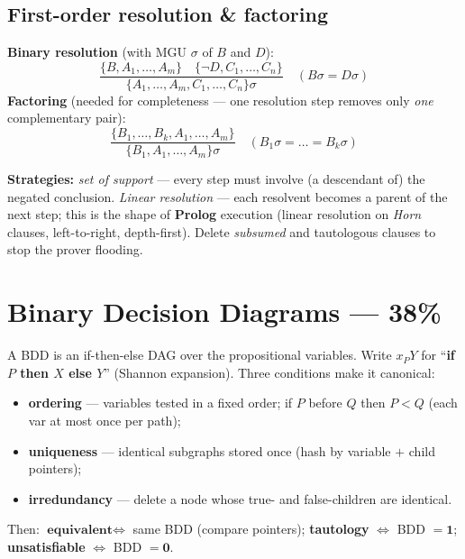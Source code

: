 \documentclass[11pt,a4paper]{article}
\begin{document}
\subsection{First-order resolution \& factoring}

\begin{must}
\textbf{Binary resolution} (with MGU $\sigma$ of $B$ and $D$):
\[
\frac{\{B,A_1,\dots,A_m\}\quad\{\neg D,C_1,\dots,C_n\}}{\{A_1,\dots,A_m,C_1,\dots,C_n\}\sigma}\quad(B\sigma=D\sigma)
\]
\textbf{Factoring} (needed for completeness --- one resolution step removes only \emph{one} complementary pair):
\[
\frac{\{B_1,\dots,B_k,A_1,\dots,A_m\}}{\{B_1,A_1,\dots,A_m\}\sigma}\quad(B_1\sigma=\dots=B_k\sigma)
\]
\end{must}

\begin{useful}
\textbf{Strategies:} \emph{set of support} --- every step must involve (a descendant of) the negated conclusion. \emph{Linear resolution} --- each resolvent becomes a parent of the next step; this is the shape of \textbf{Prolog} execution (linear resolution on \emph{Horn} clauses, left-to-right, depth-first). Delete \emph{subsumed} and tautologous clauses to stop the prover flooding.
\end{useful}

\section{Binary Decision Diagrams --- 38\%}

\begin{must}[title=ROBDD = canonical form]
A BDD is an if-then-else DAG over the propositional variables. Write $x_P Y$ for ``\textbf{if $P$ then $X$ else $Y$}'' (Shannon expansion). Three conditions make it canonical:
\begin{itemize}[leftmargin=*,itemsep=0pt]
  \item \textbf{ordering} --- variables tested in a fixed order; if $P$ before $Q$ then $P<Q$ (each var at most once per path);
  \item \textbf{uniqueness} --- identical subgraphs stored once (hash by variable $+$ child pointers);
  \item \textbf{irredundancy} --- delete a node whose true- and false-children are identical.
\end{itemize}
Then: $\textbf{equivalent} \Leftrightarrow$ same BDD (compare pointers); \textbf{tautology} $\Leftrightarrow$ BDD $=\mathbf 1$; \textbf{unsatisfiable} $\Leftrightarrow$ BDD $=\mathbf 0$.
\end{must}
\end{document}
